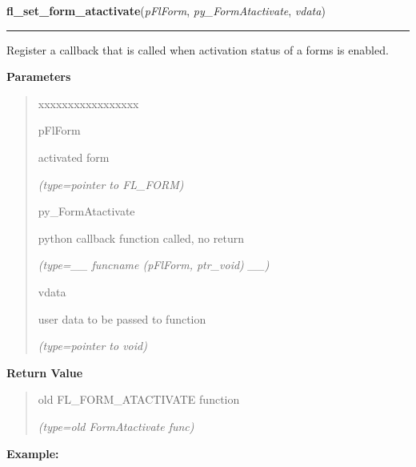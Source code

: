 \hspace{.8\funcindent}\begin{boxedminipage}{\funcwidth}

    \raggedright \textbf{fl\_set\_form\_atactivate}(\textit{pFlForm}, \textit{py\_FormAtactivate}, \textit{vdata})

    \vspace{-1.5ex}

    \rule{\textwidth}{0.5\fboxrule}
\setlength{\parskip}{2ex}
    Register a callback that is called when activation status of a forms is
    enabled.

\setlength{\parskip}{1ex}
      \textbf{Parameters}
      \vspace{-1ex}

      \begin{quote}
        \begin{Ventry}{xxxxxxxxxxxxxxxxx}

          \item[pFlForm]

          activated form

            {\it (type=pointer to FL\_FORM)}

          \item[py\_FormAtactivate]

          python callback function called, no return

            {\it (type=\_\_ funcname (pFlForm, ptr\_void) \_\_)}

          \item[vdata]

          user data to be passed to function

            {\it (type=pointer to void)}

        \end{Ventry}

      \end{quote}

      \textbf{Return Value}
    \vspace{-1ex}

      \begin{quote}
      old FL\_FORM\_ATACTIVATE function

      {\it (type=old FormAtactivate func)}

      \end{quote}

\textbf{Example:}
\begin{quote}
  \begin{itemize}


\end{itemize}
\end{quote}
\end{boxedminipage}
